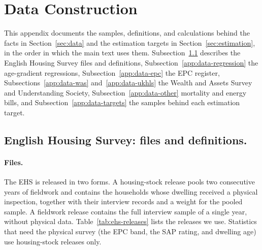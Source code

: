\section{Data Construction}\label{app:data}


This appendix documents the samples, definitions, and calculations behind
the facts in Section~\ref{sec:data} and the estimation targets in
Section~\ref{sec:estimation}, in the order in which the main text uses
them. Subsection~\ref{app:data-ehs} describes the English Housing Survey
files and definitions, Subsection~\ref{app:data-regression} the
age-gradient regressions, Subsection~\ref{app:data-epc} the EPC register,
Subsections~\ref{app:data-was} and~\ref{app:data-ukhls} the Wealth and
Assets Survey and Understanding Society, Subsection~\ref{app:data-other}
mortality and energy bills, and Subsection~\ref{app:data-targets} the
samples behind each estimation target.

\subsection{English Housing Survey: files and definitions.}\label{app:data-ehs}

\paragraph{Files.} The EHS is released in two forms. A housing-stock release
pools two consecutive years of fieldwork and contains the households whose
dwelling received a physical inspection, together with their interview
records and a weight for the pooled sample. A fieldwork release contains the
full interview sample of a single year, without physical data.
Table~\ref{tab:ehs-releases} lists the releases we use. Statistics that need
the physical survey (the EPC band, the SAP rating, and dwelling age) use
housing-stock releases only.

